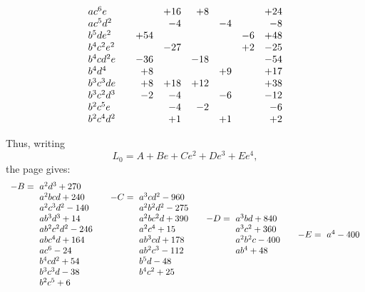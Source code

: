 \documentclass[11pt]{article}
\begin{document}
\[\begin{array}{@{}lrrrrrrr@{}}
ac^6e           &      &      &  +16 &   +8 &      &      &  +24\\
ac^5d^2         &      &      &   -4 &      &   -4 &      &   -8\\
b^5de^2         &      &  +54 &      &      &      &   -6 &  +48\\
b^4c^2e^2       &      &      &  -27 &      &      &   +2 &  -25\\
b^4cd^2e        &      &  -36 &      &  -18 &      &      &  -54\\
b^4d^4          &      &   +8 &      &      &   +9 &      &  +17\\
b^3c^3de        &      &   +8 &  +18 &  +12 &      &      &  +38\\
b^3c^2d^3       &      &   -2 &   -4 &      &   -6 &      &  -12\\
b^2c^5e         &      &      &   -4 &   -2 &      &      &   -6\\
b^2c^4d^2       &      &      &   +1 &      &   +1 &      &   +2
\end{array}
\]
\endgroup

\noindent Thus, writing
\[
  L_0 = A + Be + Ce^2 + De^3 + Ee^4,
\]
the page gives:
\[
\begin{array}{@{}llll@{}}
\begin{array}{r@{\ }l}
-B={}& a^2d^3+270\\
     & a^2bcd+240\\
     & a^2c^3d^2-140\\
     & ab^3d^3+14\\
     & ab^2c^2d^2-246\\
     & abc^4d+164\\
     & ac^6-24\\
     & b^4cd^2+54\\
     & b^3c^3d-38\\
     & b^2c^5+6
\end{array}
&
\begin{array}{r@{\ }l}
-C={}& a^3cd^2-960\\
     & a^2b^2d^2-275\\
     & a^2bc^2d+390\\
     & a^2c^4+15\\
     & ab^3cd+178\\
     & ab^2c^3-112\\
     & b^5d-48\\
     & b^4c^2+25
\end{array}
&
\begin{array}{r@{\ }l}
-D={}& a^3bd+840\\
     & a^3c^2+360\\
     & a^2b^2c-400\\
     & ab^4+48
\end{array}
&
\begin{array}{r@{\ }l}
-E={}& a^4-400
\end{array}
\end{array}
\]
\end{document}
